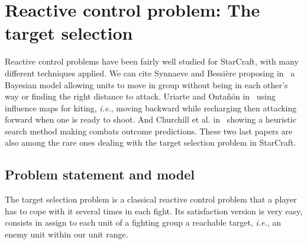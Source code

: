 \documentclass[journal]{IEEEtran}
\newcommand{\ghost}{\textsc{GHOST}\xspace}
\newcommand{\ie}{\textit{i.e.}}
\begin{document}

\section{Reactive control problem: The target selection}\label{sec:target}

Reactive control problems have been fairly well studied for StarCraft,
with  many different  techniques  applied. We  can  cite Synnaeve  and
Bessi{\`e}re  proposing   in~\cite{SynnaeveB11-b}  a   Bayesian  model
allowing units  to move in  group without  being in each  other's way or
finding the right distance to attack. Uriarte and Onta{\~n}{\'o}n
in~\cite{UriarteO12}  using influence  maps  for  kiting, \ie,  moving
backward while recharging then attacking  forward when one is ready to
shoot.  And Churchill  et  al.  in~\cite{ChurchillSB12,  ChurchillB12}
showing a heuristic search  method making combats outcome predictions.
These two  last papers are also  among the rare ones  dealing with the
target selection problem in StarCraft.

\subsection{Problem statement and model}

The target selection problem is  a classical reactive control problem that
a  player has  to  cope with  it  several times  in  each fight.   Its
satisfaction version  is very easy,  consists in assign  to each
unit of a fighting group a reachable target, \ie, an enemy unit within
our unit range.
\end{document}
